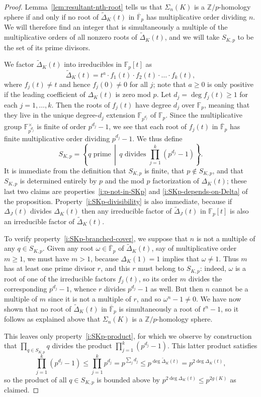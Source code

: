\documentclass[11pt]{amsart}
\numberwithin{equation}{section}
\numberwithin{theorem}{section}
\theoremstyle{definition}
\newcommand{\Z}{\mathbb{Z}}
\newcommand{\F}{\mathbb{F}}
\begin{document}
\begin{proof}
Lemma~\ref{lem:resultant-nth-root} tells us that $\Sigma_n(K)$ is a $\Z/p$-homology sphere if and only if no root of $\tilde\Delta_K(t)$ in $\overline{\F}_p$ has multiplicative order dividing $n$.  We will therefore find an integer that is simultaneously a multiple of the multiplicative orders of all nonzero roots of $\tilde\Delta_K(t)$, and we will take $S_{K,p}$ to be the set of its prime divisors.

We factor $\tilde\Delta_K(t)$ into irreducibles in $\F_p[t]$ as
\[ \tilde\Delta_K(t) = t^a \cdot f_1(t) \cdot f_2(t) \cdot \ldots \cdot f_k(t), \]
where $f_j(t) \neq t$ and hence $f_j(0) \neq 0$ for all $j$; note that $a \geq 0$ is only positive if the leading coefficient of $\Delta_K(t)$ is zero mod $p$.  Let $d_j = \deg f_j(t) \geq 1$ for each $j=1,\dots,k$.  Then the roots of $f_j(t)$ have degree $d_j$ over $\F_p$, meaning that they live in the unique degree-$d_j$ extension $\F_{p^{d_j}}$ of $\F_p$.  Since the multiplicative group $\F_{p^{d_j}}^\times$ is finite of order $p^{d_j}-1$, we see that each root of $f_j(t)$ in $\overline{\F}_p$ has finite multiplicative order dividing $p^{d_j} - 1$.  We thus define
\[ S_{K,p} = \left\{ q \text{ prime} \,\middle\vert\, q \text{ divides } \prod_{j=1}^k (p^{d_j} - 1) \right\}. \]
It is immediate from the definition that $S_{K,p}$ is finite, that $p\not\in S_{K,p}$, and that $S_{K,p}$ is determined entirely by $p$ and the mod $p$ factorization of $\Delta_K(t)$; these last two claims are properties~\eqref{i:p-not-in-SKp} and \eqref{i:SKp-depends-on-Delta} of the proposition.  Property~\eqref{i:SKp-divisibility} is also immediate, because if $\Delta_J(t)$ divides $\Delta_K(t)$ then any irreducible factor of $\tilde\Delta_J(t)$ in $\F_p[t]$ is also an irreducible factor of $\tilde\Delta_K(t)$.

To verify property~\eqref{i:SKp-branched-cover}, we suppose that $n$ is not a multiple of any $q \in S_{K,p}$.  Given any root $\omega \in \overline{\F}_p$ of $\tilde\Delta_K(t)$, say of multiplicative order $m \geq 1$, we must have $m > 1$, because $\Delta_K(1)=1$ implies that $\omega \neq 1$.  Thus $m$ has at least one prime divisor $r$, and this $r$ must belong to $S_{K,p}$: indeed, $\omega$ is a root of one of the irreducible factors $f_j(t)$, so its order $m$ divides the corresponding $p^{d_j}-1$, whence $r$ divides $p^{d_j}-1$ as well.  But then $n$ cannot be a multiple of $m$ since it is not a multiple of $r$, and so $\omega^n - 1 \neq 0$.  We have now shown that no root of $\tilde\Delta_K(t)$ in $\overline{\F}_p$ is simultaneously a root of $t^n-1$, so it follows as explained above that $\Sigma_n(K)$ is a $\Z/p$-homology sphere.

This leaves only property~\eqref{i:SKp-product}, for which we observe by construction that $\prod_{q \in S_{K,p}} q$ divides the product $\prod_{j=1}^k (p^{d_j}-1)$.  This latter product satisfies
\[ \prod_{j=1}^k (p^{d_j}-1) \leq \prod_{j=1}^k p^{d_j} = p^{\sum_j d_j} \leq p^{\deg \tilde\Delta_K(t)} = p^{2\deg\Delta_K(t)}, \]
so the product of all $q \in S_{K,p}$ is bounded above by $p^{2\deg\Delta_K(t)} \leq p^{2g(K)}$ as claimed.
\end{proof}
\end{document}
